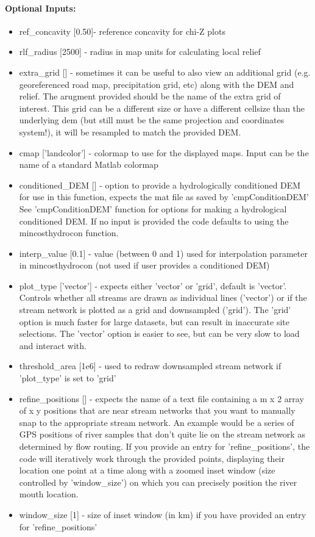 \paragraph{Optional Inputs:}
\begin{itemize}
\item ref\_concavity [0.50]- reference concavity for chi-Z plots
\item rlf\_radius [2500] - radius in map units for calculating local relief
\item extra\_grid [] - sometimes it can be useful to also view an additional grid (e.g. georeferenced road map, precipitation grid, etc) along 
with the DEM and relief. The arugment provided should be the name of the extra grid of interest. This grid can be a different 
size or have a different cellsize than the underlying dem (but still must be the same projection and coordinates system!), it will be
resampled to match the provided DEM. 
\item cmap ['landcolor'] - colormap to use for the displayed maps. Input can be the name of a standard Matlab colormap 
\item conditioned\_DEM [] - option to provide a hydrologically conditioned DEM for use in this function, expects the mat file as saved by 'cmpConditionDEM'
See 'cmpConditionDEM' function for options for making a hydrological conditioned DEM. If no input is provided the code defaults to using the 
mincosthydrocon function.
\item interp\_value [0.1] - value (between 0 and 1) used for interpolation parameter in mincosthydrocon (not used if user provides a conditioned DEM)
\item plot\_type ['vector'] - expects either 'vector' or 'grid', default is 'vector'. Controls whether all streams are drawn as individual lines ('vector') or if
the stream network is plotted as a grid and downsampled ('grid'). The 'grid' option is much faster for large datasets, 
but can result in inaccurate site selections. The 'vector' option is easier to see, but can be very slow to load and interact with.
\item threshold\_area [1e6] - used to redraw downsampled stream network if 'plot\_type' is set to 'grid'
\item refine\_positions [] - expects the name of a text file containing a m x 2 array of x y positions that are near stream networks that you want to manually snap to the appropriate stream network. An example would be a series of GPS positions of river samples that don't quite lie on the stream network as determined by flow routing.
If you provide an entry for 'refine\_positions', the code will iteratively work through the provided points, displaying their location one point
at a time along with a zoomed inset window (size controlled by 'window\_size') on which you can precisely position the river mouth location.
\item window\_size [1] - size of inset window (in km) if you have provided an entry for 'refine\_positions'
\end{itemize}


